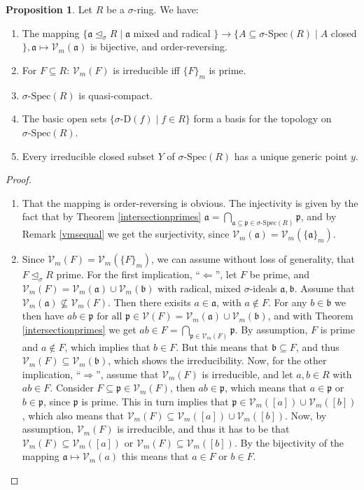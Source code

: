 \documentclass{article}
\def\Vm{\mathcal{V}_m}
\def\V{\mathcal{V}}
\def\a{\mathfrak{a}}
\def\b{\mathfrak{b}}
\def\p{\mathfrak{p}}
\def\s{\sigma}
\def\si{\unlhd_{\sigma}}
\def\sSpec{\sigma\text{-Spec}}
\def\fa{\text{ for all }}
\newenvironment{bew}{\begin{proof}[Proof]}{\end{proof}}
\theoremstyle{definition}
\newtheorem{prop}[Satz]{Proposition}
\begin{document}
\begin{prop}
Let $R$ be a $\s$-ring. We have:
\begin{enumerate}
\item \label{vmbijection} The mapping $\{ \a \si R \mid \a$ mixed and radical $\} \rightarrow \{ A \subseteq \sSpec(R) \mid A $ closed $\}, \a \mapsto \Vm(\a)$ is bijective, and order-reversing.
\item For $F \subseteq R$:  $\Vm(F)$ is irreducible iff $\{F\}_m$ is prime.
\item $\sSpec(R)$ is quasi-compact.
\item The basic open sets $\{ \s$-D$(f) \mid f \in R \}$ form a basis for the topology on $\sSpec(R)$.
\item Every irreducible closed subset $Y$ of $\sSpec(R)$ has a unique generic point $y$.
\end{enumerate}
\begin{bew}
\begin{enumerate}
\item That the mapping is order-reversing is obvious. The injectivity is given by the fact that by Theorem \ref{intersectionprimes} $\a = \bigcap_{\a \subseteq \p \in \sSpec(R)} \p$, and by Remark \ref{vmsequal} we get the surjectivity,
 since $\Vm(\a) = \Vm(\{\a\}_m)$.
\item Since $\Vm(F) = \Vm(\{F\}_m)$, we can assume without loss of generality, that $F \si R$ prime. 
For the first implication, ``$\Leftarrow$'', let $F$ be prime, and $\Vm(F) = \Vm(\a) \cup \Vm(\b)$ with radical, mixed $\s$-ideals $\a, \b$. Assume that $\Vm(\a) \not\subseteq \Vm(F)$. Then there exisits $a \in \a$, with $a \notin F$.
For any $b \in \b$ we then have $ab \in \p \fa \p \in \V(F) = \Vm(\a) \cup \Vm(\b)$, and with Theorem \ref{intersectionprimes} we get $ab \in F = \bigcap_{\p \in \Vm(F)}\p$. By assumption, $F$ is prime and $a \notin F$, which implies
 that  $b \in F$. But this means that $\b \subseteq F$, and thus $\Vm(F) \subseteq \Vm(\b)$, which shows the irreducibility. 
Now, for the other implication, ``$\Rightarrow$'', assume that $\Vm(F)$ is irreducible, and let $a,b \in R$ with $ab \in F$. Consider $F \subseteq \p \in \Vm(F)$, then $ab \in \p$, 
which means that $a \in \p$ or $b \in \p$, since $\p$ is prime. This in turn implies that $\p \in \Vm([a]) \cup \Vm([b])$, which also means that $\Vm(F) \subseteq \Vm([a]) \cup \Vm([b])$.
Now, by assumption, $\Vm(F)$ is irreducible, and thus it has to be that $\Vm(F) \subseteq \Vm([a])$ or $\Vm(F) \subseteq \Vm([b])$. By the bijectivity of the mapping $\a \mapsto \Vm(a)$ this means that $a \in F$ or $b \in F$.

\end{enumerate}
\end{bew}
\end{prop}
\end{document}
